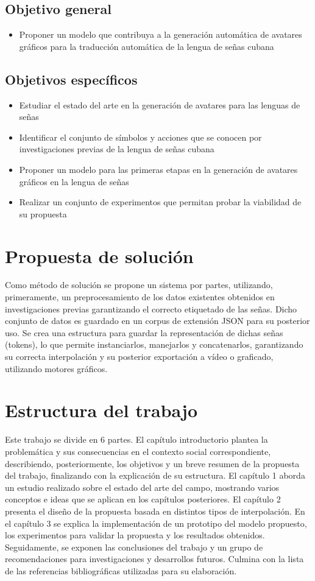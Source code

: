  
\subsection*{Objetivo general}
\begin{itemize}
\item Proponer un modelo que contribuya a la generación automática de avatares gráficos para la traducción
automática de la lengua de señas cubana

\end{itemize}

\subsection*{Objetivos específicos}
\begin{itemize}
\item Estudiar el estado del arte en la generación de avatares para las lenguas de señas
\item Identificar el conjunto de símbolos y acciones que se conocen por investigaciones previas de la lengua de señas cubana
\item Proponer un modelo para las primeras etapas en la generación de avatares gráficos en la lengua de 
señas
\item Realizar un conjunto de experimentos que permitan probar la viabilidad de su propuesta
\end{itemize}

\section*{Propuesta de solución}
Como método de solución se propone un sistema por partes, utilizando, primeramente, un preprocesamiento de los datos existentes obtenidos en investigaciones previas garantizando el correcto etiquetado de las señas. Dicho conjunto de datos es guardado en un corpus de extensión JSON para su posterior uso. Se crea una estructura para guardar la representación de dichas señas (tokens), lo que permite instanciarlos, manejarlos y concatenarlos, garantizando su correcta interpolación y su posterior exportación a vídeo o graficado, utilizando motores gráficos.  

\section*{Estructura del trabajo}
Este trabajo se divide en 6 partes. El capítulo introductorio plantea la problemática y sus consecuencias en el contexto social correspondiente, describiendo, posteriormente, los objetivos y un breve resumen de la propuesta del trabajo, finalizando con la explicación de su estructura. El capítulo 1 aborda un estudio realizado sobre el estado del arte del campo, mostrando varios conceptos e ideas que se aplican en los capítulos posteriores. El capítulo 2 presenta el diseño de la propuesta basada en distintos tipos de interpolación. En el capítulo 3 se explica la implementación de un prototipo del modelo propuesto, los experimentos para validar la propuesta y los resultados obtenidos. Seguidamente, se exponen las conclusiones del trabajo y un grupo de recomendaciones para investigaciones y desarrollos futuros. Culmina con la lista de las referencias bibliográficas utilizadas para su elaboración.